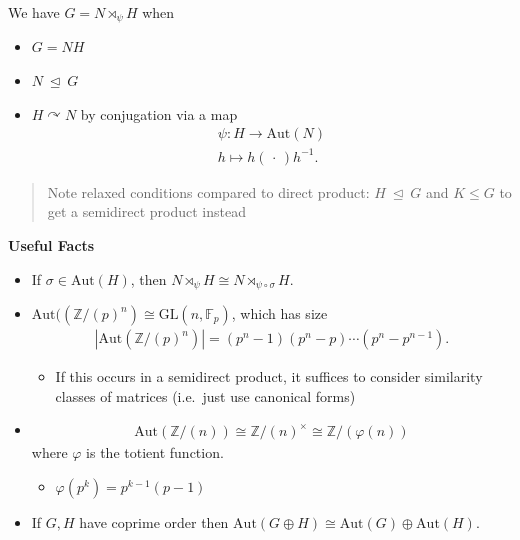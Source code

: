We have \(G = N \rtimes_\psi H\) when

\begin{itemize}
\item
  \(G = NH\)
\item
  \(N {~\trianglelefteq~}G\)
\item
  \(H \curvearrowright N\) by conjugation via a map
  \begin{align*}  
  \psi: H \longrightarrow{\mathrm{Aut}}(N) \\
  h \mapsto h({\,\cdot\,})h^{-1}
  .\end{align*}
\end{itemize}

\begin{quote}
Note relaxed conditions compared to direct product:
\(H{~\trianglelefteq~}G\) and \(K\leq G\) to get a semidirect product
instead
\end{quote}

\textbf{Useful Facts}

\begin{itemize}
\item
  If \(\sigma \in {\mathrm{Aut}}(H)\), then
  \(N \rtimes_\psi H \cong N \rtimes_{\psi \circ \sigma} H\).
\item
  \({\mathrm{Aut}}(({\mathbb{Z}}/(p)^n) \cong \mathrm{GL}(n, {\mathbb{F}}_p)\),
  which has size
  \begin{align*}  
  {\left\lvert {{\mathrm{Aut}}({\mathbb{Z}}/(p)^n)} \right\rvert} = (p^n-1)(p^n-p)\cdots(p^n-p^{n-1})
  .\end{align*}

  \begin{itemize}
  \tightlist
  \item
    If this occurs in a semidirect product, it suffices to consider
    similarity classes of matrices (i.e.~just use canonical forms)
  \end{itemize}
\item

  \begin{align*} {\mathrm{Aut}}({\mathbb{Z}}/(n)) \cong {\mathbb{Z}}/(n)^{\times}\cong {\mathbb{Z}}/({\varphi(n)})\end{align*}
  where \(\varphi\) is the totient function.

  \begin{itemize}
  \tightlist
  \item
    \(\varphi(p^k) = p^{k-1}(p-1)\)
  \end{itemize}
\item
  If \(G, H\) have coprime order then
  \({\mathrm{Aut}}(G\oplus H) \cong {\mathrm{Aut}}(G) \oplus {\mathrm{Aut}}(H)\).
\end{itemize}

